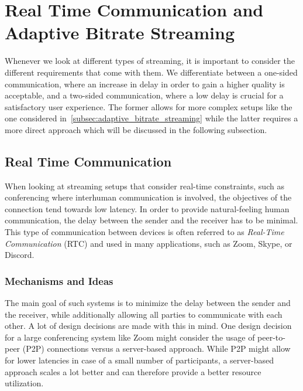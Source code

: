 \section{Real Time Communication and Adaptive Bitrate Streaming}\label{sec:rt_and_adaptive_bitrate_streaming}

Whenever we look at different types of streaming, it is important to consider the 
different requirements that come with them.
We differentiate between a one-sided communication, where an increase in delay 
in order to gain a higher quality is acceptable, and a two-sided communication, 
where a low delay is crucial for a satisfactory user experience.
The former allows for more complex setups like the one considered 
in~\autoref{subsec:adaptive_bitrate_streaming} while the latter requires
a more direct approach which will be discussed in the following subsection.

\subsection{Real Time Communication}
When looking at streaming setups that consider real-time constraints, such as conferencing 
where interhuman communication is involved, the objectives of the connection tend towards
low latency.
In order to provide natural-feeling human communication, the delay between the sender 
and the receiver has to be minimal.
This type of communication between devices is often referred to as \textit{Real-Time Communication} 
(RTC) and used in many applications, such as Zoom, Skype, or Discord.

\subsubsection{Mechanisms and Ideas}
The main goal of such systems is to minimize the delay between the sender and the receiver,
while additionally allowing all parties to communicate with each other.
A lot of design decisions are made with this in mind.
One design decision for a large conferencing system like Zoom
might consider the usage of peer-to-peer (P2P) connections versus a server-based
approach.
While P2P might allow for lower latencies in case of a small number of participants,
a server-based approach scales a lot better and can therefore provide a better
resource utilization.

